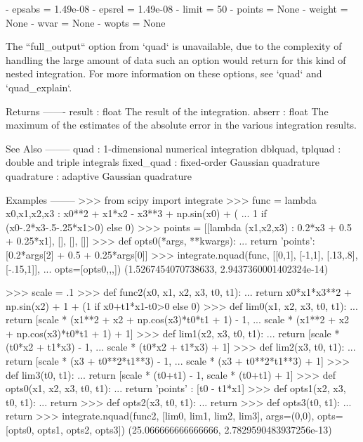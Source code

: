 \begin{DoxyVerb}
      - epsabs = 1.49e-08
      - epsrel = 1.49e-08
      - limit  = 50
      - points = None
      - weight = None
      - wvar   = None
      - wopts  = None

    The ``full_output`` option from `quad` is unavailable, due to the
    complexity of handling the large amount of data such an option would
    return for this kind of nested integration.  For more information on
    these options, see `quad` and `quad_explain`.

Returns
-------
result : float
    The result of the integration.
abserr : float
    The maximum of the estimates of the absolute error in the various
    integration results.

See Also
--------
quad : 1-dimensional numerical integration
dblquad, tplquad : double and triple integrals
fixed_quad : fixed-order Gaussian quadrature
quadrature : adaptive Gaussian quadrature

Examples
--------
>>> from scipy import integrate
>>> func = lambda x0,x1,x2,x3 : x0**2 + x1*x2 - x3**3 + np.sin(x0) + (
...                                 1 if (x0-.2*x3-.5-.25*x1>0) else 0)
>>> points = [[lambda (x1,x2,x3) : 0.2*x3 + 0.5 + 0.25*x1], [], [], []]
>>> def opts0(*args, **kwargs):
...     return {'points':[0.2*args[2] + 0.5 + 0.25*args[0]]}
>>> integrate.nquad(func, [[0,1], [-1,1], [.13,.8], [-.15,1]],
...                 opts=[opts0,{},{},{}])
(1.5267454070738633, 2.9437360001402324e-14)

>>> scale = .1
>>> def func2(x0, x1, x2, x3, t0, t1):
...     return x0*x1*x3**2 + np.sin(x2) + 1 + (1 if x0+t1*x1-t0>0 else 0)
>>> def lim0(x1, x2, x3, t0, t1):
...     return [scale * (x1**2 + x2 + np.cos(x3)*t0*t1 + 1) - 1,
...             scale * (x1**2 + x2 + np.cos(x3)*t0*t1 + 1) + 1]
>>> def lim1(x2, x3, t0, t1):
...     return [scale * (t0*x2 + t1*x3) - 1,
...             scale * (t0*x2 + t1*x3) + 1]
>>> def lim2(x3, t0, t1):
...     return [scale * (x3 + t0**2*t1**3) - 1,
...             scale * (x3 + t0**2*t1**3) + 1]
>>> def lim3(t0, t1):
...     return [scale * (t0+t1) - 1, scale * (t0+t1) + 1]
>>> def opts0(x1, x2, x3, t0, t1):
...     return {'points' : [t0 - t1*x1]}
>>> def opts1(x2, x3, t0, t1):
...     return {}
>>> def opts2(x3, t0, t1):
...     return {}
>>> def opts3(t0, t1):
...     return {}
>>> integrate.nquad(func2, [lim0, lim1, lim2, lim3], args=(0,0),
                    opts=[opts0, opts1, opts2, opts3])
(25.066666666666666, 2.7829590483937256e-13)\end{DoxyVerb}
 \hypertarget{namespacescipy_1_1integrate_1_1quadpack_aeccf54fc8094c3b72b7bd25ba83c12fb}{}
